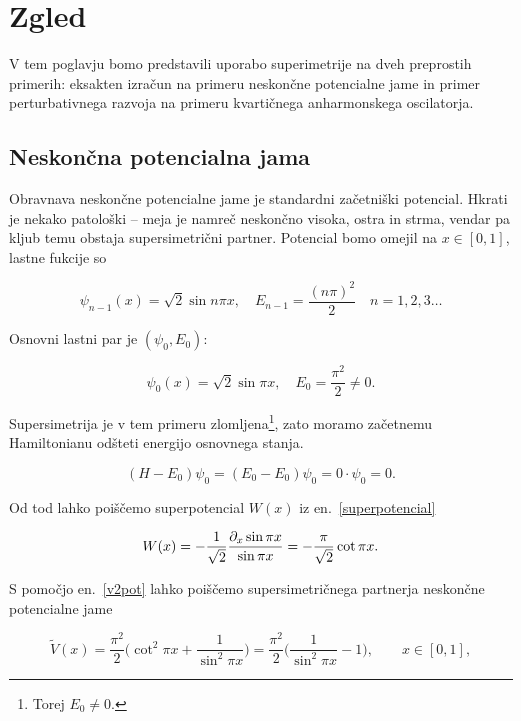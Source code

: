 \section{Zgled}

V tem poglavju bomo predstavili uporabo superimetrije na dveh preprostih primerih: eksakten izra\v cun na primeru
neskon\v cne potencialne jame in primer perturbativnega razvoja na primeru kvarti\v cnega anharmonskega oscilatorja.

\subsection{Neskon\v cna potencialna jama}

Obravnava neskon\v cne potencialne jame je standardni za\v cetni\v ski potencial. Hkrati je nekako patolo\v ski -- meja je
namre\v c neskon\v cno visoka, ostra in strma, vendar pa kljub temu obstaja supersimetri\v cni partner. Potencial bomo
omejil na $x \in [0,1]$, lastne fukcije so 

\begin{equation}
	\psi_{n-1} (x) = \sqrt{2}\sin n\pi x, \quad E_{n-1} = \frac{(n\pi)^2}{2}
		\quad n = 1, 2, 3 \ldots
\end{equation}

\ni Osnovni lastni par je $(\psi_0, E_0)$:

\begin{equation}
	\psi_0 (x) = \sqrt{2}\sin\pi x, \quad E_0 = \frac{\pi^2}{2} \neq 0.
\end{equation}

\ni Supersimetrija je v tem primeru zlomljena\footnote{Torej $E_0 \neq 0$.}, zato moramo za\v cetnemu Hamiltonianu
od\v steti energijo osnovnega stanja.

\begin{equation}
	(H - E_0)\psi_0 = (E_0 - E_0)\psi_0 =
		0\cdot\psi_0 = 0. \label{translacija}
\end{equation}

\ni Od tod lahko poi\v s\v cemo superpotencial $W(x)$ iz en.~\eqref{superpotencial}

\begin{equation}
	W(x) = -\frac{1}{\sqrt{2}} \frac{\partial_x \sin \pi x}{\sin \pi x} = -\frac{\pi}{\sqrt{2}}\cot \pi x.
\end{equation}

\ni S pomo\v cjo en.~\eqref{v2pot} lahko poi\v s\v cemo supersimetri\v cnega partnerja neskon\v cne potencialne jame

\begin{equation}
	\tilde{V} (x) = \frac{\pi^2}{2}\bigg(\cot^2 \pi x + \frac{1}{\sin^2 \pi x}\bigg)
		= \frac{\pi^2}{2}\bigg(\frac{1}{\sin^2 \pi x} - 1\bigg), \qquad x \in [0,1],
	\label{pot-nes-jama}
\end{equation}

